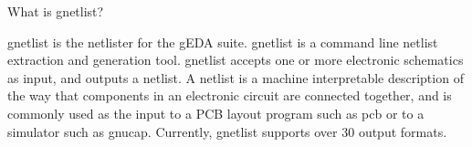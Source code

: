    What is gnetlist?

   gnetlist is the netlister for the gEDA suite. gnetlist is a command
   line netlist extraction and generation tool. gnetlist accepts one or
   more electronic schematics as input, and outputs a netlist. A netlist
   is a machine interpretable description of the way that components in an
   electronic circuit are connected together, and is commonly used as the
   input to a PCB layout program such as pcb or to a simulator such as
   gnucap. Currently, gnetlist supports over 30 output formats.
